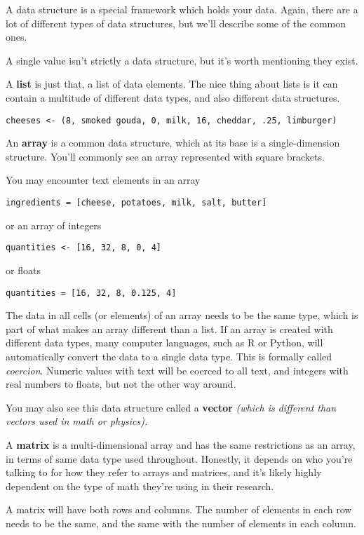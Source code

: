 \documentclass[
]{book}
\begin{document}
A data structure is a special framework which holds your data. Again, there are a lot of different types of data structures, but we'll describe some of the common ones.

A single value isn't strictly a data structure, but it's worth mentioning they exist.

A \textbf{list} is just that, a list of data elements. The nice thing about lists is it can contain a multitude of different data types, and also different data structures.

\texttt{cheeses\ \textless{}-\ (8,\ smoked\ gouda,\ 0,\ milk,\ 16,\ cheddar,\ .25,\ limburger)}

An \textbf{array} is a common data structure, which at its base is a single-dimension structure. You'll commonly see an array represented with square brackets.

You may encounter text elements in an array

\texttt{ingredients\ =\ {[}cheese,\ potatoes,\ milk,\ salt,\ butter{]}}

or an array of integers

\texttt{quantities\ \textless{}-\ {[}16,\ 32,\ 8,\ 0,\ 4{]}}

or floats

\texttt{quantities\ =\ {[}16,\ 32,\ 8,\ 0.125,\ 4{]}}

The data in all cells (or elements) of an array needs to be the same type, which is part of what makes an array different than a list. If an array is created with different data types, many computer languages, such as R or Python, will automatically convert the data to a single data type. This is formally called \emph{coercion}. Numeric values with text will be coerced to all text, and integers with real numbers to floats, but not the other way around.

You may also see this data structure called a \textbf{vector} \emph{(which is different than vectors used in math or physics).}

A \textbf{matrix} is a multi-dimensional array and has the same restrictions as an array, in terms of same data type used throughout. Honestly, it depends on who you're talking to for how they refer to arrays and matrices, and it's likely highly dependent on the type of math they're using in their research.

A matrix will have both rows and columns. The number of elements in each row needs to be the same, and the same with the number of elements in each column.
\end{document}
